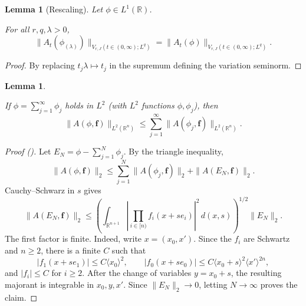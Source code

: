 \documentclass[12pt,reqno]{amsart}
\newcommand{\auto}{{({\tiny\faCar})}}
\theoremstyle{plain}
\newtheorem{lemma}[theorem]{Lemma}
\numberwithin{equation}{section}
\theoremstyle{remark}
\newcommand{\uses}[1]{}
\newcommand{\usesdefs}[1]{}
\newcommand{\leanok}{}
\newcommand{\lean}[1]{}
\newcommand{\R}{{\mathbb R}}
\begin{document}
\begin{lemma}[Rescaling]\label{lem:rescaling}\uses{}\usesdefs{A_def}Let $\phi\in L^1(\mathbb{R})$.
\lean{Auto.rescaling}
\leanok
For all $r,q,\lambda>0$,
\begin{equation}\label{auto:variation-rescaling-invariance} \|A_t({\phi_{(\lambda)}})\|_{V_{r,J}(t\in (0,\infty); L^q)} =  \|A_t({\phi})\|_{V_{r,J}(t\in (0,\infty); L^q)}. \end{equation}
\end{lemma}

\begin{proof}
By replacing $t_j \lambda\mapsto t_j$ in the supremum defining the variation seminorm.
\end{proof}


\begin{lemma}\label{lem:norm_A_sum_le_sum}\uses{}\usesdefs{A_def,bracket bump}
\lean{Auto.normASumLeSum}
\leanok
If $\phi=\sum_{j=1}^\infty \phi_j$ holds in $L^2$ (with $L^2$ functions $\phi, \phi_j$), then
\begin{equation}\label{auto:twisted-average-series-triangle} \|A(\phi, \mathbf{f})\|_{L^2(\mathbb{R}^n)} \le \sum_{j=1}^\infty \|A({\phi_j}, \mathbf{f})\|_{L^2(\mathbb{R}^n)}. \end{equation}
\end{lemma}

\begin{proof}[Proof \auto]
Let $E_N=\phi-\sum_{j=1}^N\phi_j$. By the triangle inequality,
\[
\|A(\phi,\mathbf f)\|_2
\le
\sum_{j=1}^N\|A(\phi_j,\mathbf f)\|_2
+\|A(E_N,\mathbf f)\|_2.
\]
Cauchy--Schwarz in $s$ gives
\[
\|A(E_N,\mathbf f)\|_2
\le
\left(\int_{\R^{n+1}}
\left|\prod_{i\in[n)}f_i(x+se_i)\right|^2\,d(x,s)\right)^{1/2}
\|E_N\|_2.
\]
The first factor is finite. Indeed, write $x=(x_0,x')$. Since the $f_i$ are Schwartz and $n\ge2$, there is a finite $C$ such that
\[
|f_1(x+se_1)|\le C\langle x_0\rangle^2,
\qquad
|f_0(x+se_0)|\le C\langle x_0+s\rangle^2\langle x'\rangle^{2n},
\]
and $|f_i|\le C$ for $i\ge2$. After the change of variables $y=x_0+s$, the resulting majorant is integrable in $x_0,y,x'$. Since $\|E_N\|_2\to0$, letting $N\to\infty$ proves the claim.
\end{proof}
\end{document}
